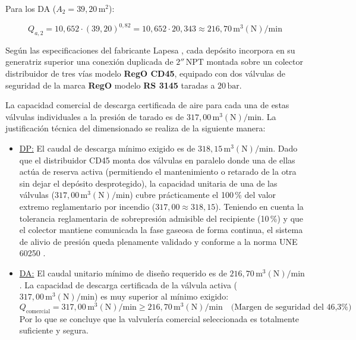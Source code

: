 \documentclass[12pt]{article}
\begin{document}
        Para los DA ($A_2 = 39,20\,\text{m}^2$):

            \begin{equation}
                Q_{a, 2} = 10,652 \cdot (39,20)^{0,82} = 10,652 \cdot 20,343 \approx 216,70\,\text{m}^3(\text{N})/\text{min}
            \end{equation}
        

        Según las especificaciones del fabricante Lapesa \cite{lapesa}, cada depósito incorpora en su generatriz superior una conexión duplicada de $2''\,\text{NPT}$ montada sobre un colector distribuidor de tres vías modelo \textbf{RegO CD45}, equipado con dos válvulas de seguridad de la marca \textbf{RegO} modelo \textbf{RS 3145} taradas a $20\,\text{bar}$. 

        La capacidad comercial de descarga certificada de aire para cada una de estas válvulas individuales a la presión de tarado es de $317,00\,\text{m}^3(\text{N})/\text{min}$. La justificación técnica del dimensionado se realiza de la siguiente manera:
        \begin{itemize}
            \item \underline{DP:} El caudal de descarga mínimo exigido es de $318,15\,\text{m}^3(\text{N})/\text{min}$. Dado que el distribuidor CD45 monta dos válvulas en paralelo donde una de ellas actúa de reserva activa (permitiendo el mantenimiento o retarado de la otra sin dejar el depósito desprotegido), la capacidad unitaria de una de las válvulas ($317,00\,\text{m}^3(\text{N})/\text{min}$) cubre prácticamente el 100\,\% del valor extremo reglamentario por incendio ($317,00 \approx 318,15$). Teniendo en cuenta la tolerancia reglamentaria de sobrepresión admisible del recipiente (10\,\%) y que el colector mantiene comunicada la fase gaseosa de forma continua, el sistema de alivio de presión queda plenamente validado y conforme a la norma UNE 60250 \cite{une60250}.
            \item \underline{DA:} El caudal unitario mínimo de diseño requerido es de $216,70\,\text{m}^3(\text{N})/\text{min}$. La capacidad de descarga certificada de la válvula activa ($317,00\,\text{m}^3(\text{N})/\text{min}$) es muy superior al mínimo exigido:
            \begin{equation}
                Q_{\text{comercial}} = 317,00\,\text{m}^3(\text{N})/\text{min} \ge 216,70\,\text{m}^3(\text{N})/\text{min} \quad \text{(Margen de seguridad del 46,3\%)}
            \end{equation}
            Por lo que se concluye que la valvulería comercial seleccionada es totalmente suficiente y segura.
        \end{itemize}
\end{document}
